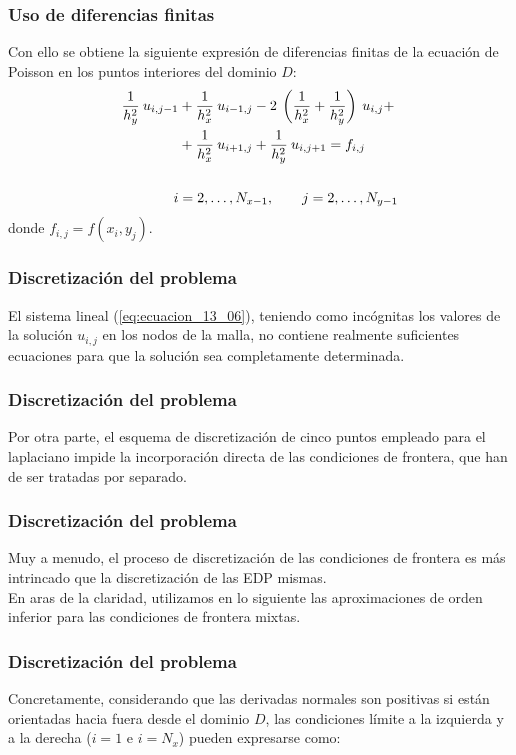 \documentclass[12pt]{beamer}
\begin{document}
\begin{frame}
\frametitle{Uso de diferencias finitas}
Con ello se obtiene la siguiente expresión de diferencias finitas de la ecuación de Poisson en los puntos interiores del dominio $D$:
\pause
\begin{align}
\begin{aligned}
\dfrac{1}{h_{y}^{2}} \: u_{i, j-1} &+ \dfrac{1}{h_{x}^{2}} \: u_{i-1, j} - 2 \: \left( \dfrac{1}{h_{x}^{2}} + \dfrac{1}{h_{y}^{2}} \right) \: u_{i, j} + \\
&+ \dfrac{1}{h_{x}^{2}} \: u_{i+1, j} + \dfrac{1}{h_{y}^{2}} \: u_{i, j+1} = f_{i, j} \\
\\
i &= 2, \ldots, N_{x-1}, \hspace{0.7cm} j = 2, \ldots, N_{y-1}
\end{aligned}
\label{eq:ecuacion_13_06}
\end{align}
donde $f_{i, j} = f(x_{i}, y_{j})$.
\end{frame}
\begin{frame}
\frametitle{Discretización del problema}
El sistema lineal (\ref{eq:ecuacion_13_06}), teniendo como incógnitas los valores de la solución $u_{i, j}$ en los nodos de la malla, no contiene realmente suficientes ecuaciones para que la solución sea completamente determinada. 
\end{frame}
\begin{frame}
\frametitle{Discretización del problema}
Por otra parte, el esquema de discretización de cinco puntos empleado para el laplaciano impide la incorporación directa de las condiciones de frontera, que han de ser tratadas por separado.
\end{frame}
\begin{frame}
\frametitle{Discretización del problema}
Muy a menudo, el proceso de discretización de las condiciones de frontera es más intrincado que la discretización de las EDP mismas.
\\
\bigskip
\pause
En aras de la claridad, utilizamos en lo siguiente las aproximaciones de orden inferior para las condiciones de frontera mixtas.
\end{frame}
\begin{frame}
\frametitle{Discretización del problema}
Concretamente, considerando que las derivadas normales son positivas si están orientadas hacia fuera desde el dominio $D$, las condiciones límite a la izquierda y a la derecha ($i = 1$ e $i = N_{x}$) pueden expresarse como:
\end{frame}
\end{document}
